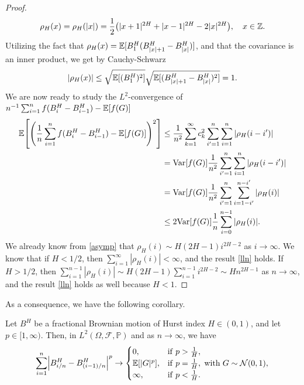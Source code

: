 \begin{proof}
\begin{equation}
    \rho_{H}(x)=\rho_{H}(|x|)=\frac{1}{2}\left(|x+1|^{2H}+|x-1|^{2H}-2|x|^{2H}\right), \quad x\in \Z. 
\end{equation}
Utilizing the fact that $\rho_{H}(x)=\mathbb{E}[B_{1}^{H}(B_{|x|+1}^{H}-B_{|x|}^{H})]$, and that the covariance is an inner product, we get by Cauchy-Schwarz
\begin{align}
     |\rho_{H}(x)|\leq \sqrt{\mathbb{E}[(B_{1}^{H})^{2}]}\sqrt{\mathbb{E}[(B_{|x|+1}^{H}-B_{|x|}^{H})^{2}]}=1.
\end{align}
We are now ready to study the $L^2$-convergence of $n^{-1}\sum_{i=1}^{n}f(B_{i}^{H}-B_{i-1}^{H})-\mathbb{E}[f(G)]$
\begin{align}
    \E\left[\left(\frac{1}{n}\sum_{i=1}^{n}f(B_{i}^{H}-B_{i-1}^{H})-\E[f(G)]\right)^{2}\right] &\leq \frac{1}{n^{2}}\sum_{k=1}^{\infty}c_{k}^{2}\sum_{i'=1}^{n}\sum_{i =1}^{n}|\rho_{H}(i-i')|\\
    &= \mathrm{Var}[f(G)]\frac{1}{n^2}\sum_{i'=1}^{n}\sum_{i =1}^{n}|\rho_{H}(i-i')|\\
    &= \mathrm{Var}[f(G)]\frac{1}{n^2}\sum_{i'=1}^{n}\sum_{i=1-i'}^{n-i'}|\rho_{H}(i)|\\
    &\leq 2\mathrm{Var}[f(G)]\frac{1}{n}\sum_{i=0}^{n-1}|\rho_{H}(i)|.
\end{align}
We already know from \eqref{asymp} that $\rho_{H}(i)\sim H(2H-1)i^{2H-2}$ as $i\to \infty$. We know that if $H<1/2$, then $\sum_{i=1}^{\infty}|\rho_{H}(i)|<\infty$, and the result \eqref{lln} holds. If $H>1/2$, then $\sum_{i=1}^{n-1}|\rho_{H}(i)|\sim H(2H-1)\sum_{i=1}^{n-1}i^{2H-2}\sim Hn^{2H-1}$ as $n\to \infty$, and the result \eqref{lln} holds as well because $H<1$.
\end{proof}
As a consequence, we have the following corollary.
\begin{cor}\label{pvariations}
    Let $B^H$ be a fractional Brownian motion of Hurst index $H\in (0,1)$, and let $p\in [1,\infty)$. Then, in $L^{2}(\Omega,\mathcal{F},\mathbb{P})$ and as $n\to\infty$, we have
    \begin{equation}
        \sum_{i=1}^{n}\left|B_{i/n}^{H}-B_{(i-1)/n}^{H}\right|^{p}\to \begin{cases}
            0, & \mathrm{if} \hspace{3 pt}p>\frac{1}{H},\\
            \E[|G|^{p}], & \mathrm{if}\hspace{3 pt}p=\frac{1}{H},\hspace{3 pt} \mathrm{with}\hspace{3 pt} G\sim \mathcal{N}(0,1),\\
            \infty, & \mathrm{if}\hspace{3 pt}p<\frac{1}{H}.
        \end{cases}
    \end{equation}
\end{cor}

